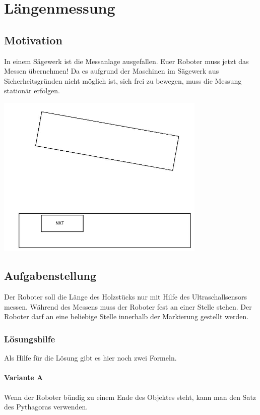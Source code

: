 \chapter{Längenmessung}
\section{Motivation}
In einem Sägewerk ist die Messanlage ausgefallen. Euer Roboter muss jetzt das Messen übernehmen! Da es aufgrund der Maschinen im Sägewerk aus Sicherheitsgründen nicht möglich ist, sich frei zu bewegen, muss die Messung stationär erfolgen.

\begin{capfigure}
	\includegraphics[width=10cm]{images/messen_skizze}
\end{capfigure}

\section{Aufgabenstellung}
Der Roboter soll die Länge des Holzstücks nur mit Hilfe des Ultraschallsensors messen. Während des Messens muss der Roboter fest an einer Stelle stehen. Der Roboter darf an eine beliebige Stelle innerhalb der Markierung gestellt werden. 

\subsection{Lösungshilfe}
Als Hilfe für die Lösung gibt es hier noch zwei Formeln.

\subsubsection{Variante A}
Wenn der Roboter bündig zu einem Ende des Objektes steht, kann man den Satz des Pythagoras verwenden.

